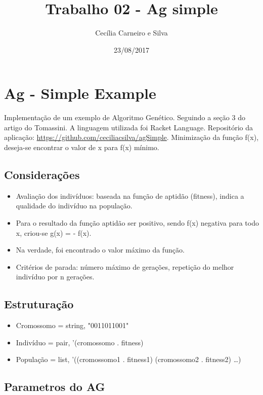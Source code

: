 \documentclass[11pt]{article}
\author{Cecília Carneiro e Silva}
\date{23/08/2017}
\title{Trabalho 02 - Ag simple}
\begin{document}
\maketitle

\section{Ag - Simple Example}
\label{sec-1}

Implementação de um exemplo de Algoritmo Genético. Seguindo a seção 3 do artigo do Tomassini. A linguagem utilizada foi Racket Language. Repositório da aplicação: \url{https://github.com/ceciliacsilva/agSimple}.
Minimização da função f(x), deseja-se encontrar o valor de x para f(x) mínimo.

\subsection{Considerações}
\label{sec-1-1}

\begin{itemize}
\item Avaliação dos indivíduos: baseada na função de aptidão (fitness), indica a qualidade do indivíduo na população.
\item Para o resultado da função aptidão ser positivo, sendo f(x) negativa para todo x, criou-se g(x) = - f(x).
\item Na verdade, foi encontrado o valor máximo da função.
\item Critérios de parada: número máximo de gerações, repetição do melhor indivíduo por n gerações.
\end{itemize}

\subsection{Estruturação}
\label{sec-1-2}

\begin{itemize}
\item Cromossomo = string, "0011011001"
\item Indivíduo = pair, '(cromossomo . fitness)
\item População = list, '((cromossomo1 . fitness1) (cromossomo2 . fitness2) \ldots{})
\end{itemize}

\subsection{Parametros do AG}
\label{sec-1-3}
\end{document}
